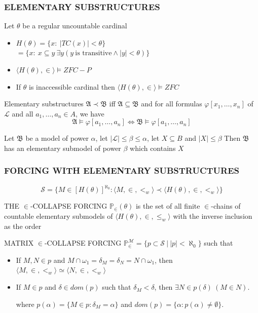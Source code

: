 \documentclass{beamer}
\begin{document}
\begin{frame}
\frametitle{ELEMENTARY SUBSTRUCTURES}
Let $\theta$ be a regular uncountable cardinal
\begin{itemize}
\item $H(\theta)=\{x: \ |TC(x)| < \theta \}$\\
\hspace{9mm}$=\{x: \ x \subseteq y \ \exists y(y \ \text{is transitive} \land |y| < \theta)\}$
\item $\langle H(\theta), \in \rangle \models ZFC-P$
\item If $\theta$ is inaccessible cardinal then $\langle H(\theta), \in \rangle \models ZFC$
\end{itemize}
\begin{block}{Elementary substructures}
$\mathfrak{A} \prec \mathfrak{B}$ iff $\mathfrak{A} \subseteq \mathfrak{B}$ and for all formulas $\varphi[x_1, \dots, x_n]$ of $\mathscr{L}$ and all $a_1, \dots, a_n \in A$, we have
$$\mathfrak{A}\models \varphi[a_1, \dots, a_n] \iff \mathfrak{B}\models \varphi[a_1, \dots, a_n]$$
\end{block}
Let $\mathfrak{B}$ be a model of power $\alpha$, let $|\mathscr{L}| \leq \beta \leq \alpha$, let $X \subseteq B$ and $|X| \leq \beta$ Then $\mathfrak{B}$ has an elementary submodel of power $\beta$ which contains $X$
\end{frame}
\begin{frame}
\frametitle{FORCING WITH ELEMENTARY SUBSTRUCTURES}
$$\mathcal{S}= \{M \in [H(\theta)]^{\aleph_0} : \langle M, \in, <_w \rangle \prec \langle H(\theta), \in, <_w \rangle \}$$
\vspace{-2mm}
\begin{block}{THE $\in$-COLLAPSE FORCING}
$\mathbb{P}_{\in}(\theta)$ is the set of all finite $\in$-chains of countable elementary submodels of $\langle H(\theta), \in, \leq_w \rangle $ with the inverse inclusion as the order
\end{block}
\begin{block}{MATRIX $\in$-COLLAPSE FORCING}
$\mathbb{P}_{\in}^{\mathcal{M}}= \{p \subset \mathcal{S} \ | \ |p| < \aleph_0 \}$ such that
\begin{itemize}
\item If $M, N \in p$ and $M \cap \omega_1 = \delta_M = \delta_N = N \cap \omega_1$, then $\langle M, \in, <_w \rangle \simeq \langle N, \in, <_w \rangle$
\item If $M \in p$ and $\delta \in dom(p)$ such that $\delta_M < \delta$, then $ \exists N \in p(\delta) \ (M \in N)$.

where $p(\alpha)=\{ M \in p : \delta_M=\alpha\}$ and $dom(p)= \{\alpha: p(\alpha) \neq \emptyset\}$.
\end{itemize}
\end{block}

\end{frame}
\end{document}
